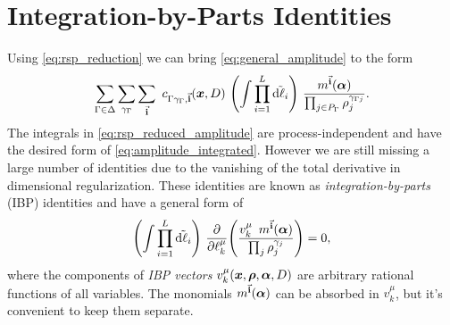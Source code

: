 

\section{Integration-by-Parts Identities}
\label{sec:ibp}


Using \cref{eq:rsp_reduction} we can bring \cref{eq:general_amplitude} to the form 
\begin{equation} \label{eq:rsp_reduced_amplitude}
  \sum_{\Gamma \in \Delta} \sum_{\gamma_\Gamma} \sum_{\va{i}} ~ c_{\Gamma\gamma_\Gamma, \va{i}} (\vb*{x},D) ~ 
  \qty(\int \prod_{i=1}^{L} \tilde{\dd{\ell_i}}) ~  
  \frac{m^{\va{i}}(\vb*{\alpha})%
    }{\prod_{j\in P_\Gamma} \rho_j^{\gamma_{\Gamma j}}}.
\end{equation}
The integrals in \cref{eq:rsp_reduced_amplitude} are process-independent and have the desired form of \cref{eq:amplitude_integrated}.
However we are still missing a large number of identities due to the vanishing of the total derivative in dimensional regularization.
These identities are known as \emph{integration-by-parts} (IBP) identities \cite{Chetyrkin:1981qh,Tkachov:1981wb} and have a general
form of
\begin{equation}
  \qty(\int \prod_{i=1}^{L} \tilde{\dd{\ell_i}}) ~  \pdv{\ell_k^\mu}(
  \frac{ v_k^\mu \ommit{(\vb*{x},\vb*{\rho},\vb*{\alpha},D)} ~ \, m^{\va{i}}(\vb*{\alpha})
    }{\prod_{j} \rho_j^{\gamma_{j}}}
    ) = 0,
  \label{eq:ibps}
\end{equation}
where the components of \emph{IBP vectors} $v_k^\mu(\vb*{x},\vb*{\rho},\vb*{\alpha},D)$ are arbitrary rational functions
of all variables. The monomials $m^{\va{i}}(\vb*{\alpha})$ can be absorbed in $v_k^\mu$, but
it's convenient to keep them separate.

